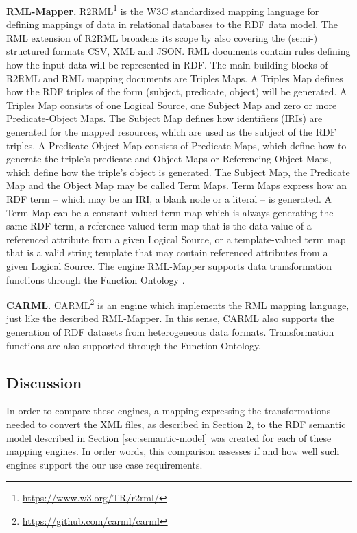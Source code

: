 \documentclass[runningheads]{llncs}
\begin{document}
\textbf{RML-Mapper.} R2RML\footnote{\url{https://www.w3.org/TR/r2rml/}} is the W3C standardized mapping language for defining mappings of data in relational databases to the RDF data model. The RML \cite{dimou_ldow_2014} extension of R2RML broadens its scope by also covering the (semi-) structured formats CSV, XML and JSON. RML documents contain rules defining how the input data will be represented in RDF. The main building blocks of R2RML and RML mapping documents are Triples Maps. A Triples Map defines how the RDF triples of the form (subject, predicate, object) will be generated. A Triples Map consists of one Logical Source, one Subject Map and zero or more Predicate-Object Maps. The Subject Map defines how identifiers (IRIs) are generated for the mapped resources, which are used as the subject of the RDF triples. A Predicate-Object Map consists of Predicate Maps, which define how to generate the triple’s predicate and Object Maps or Referencing Object Maps, which define how the triple's object is generated. The Subject Map, the Predicate Map and the Object Map may be called Term Maps. Term Maps express how an RDF term – which may be an IRI, a blank node or a literal – is generated. A Term Map can be a constant-valued term map which is always generating the same RDF term, a reference-valued term map that is the data value of a referenced attribute from a given Logical Source, or a template-valued term map that is a valid string template that may contain referenced attributes from a given Logical Source. The engine RML-Mapper supports data transformation functions through the Function Ontology \cite{DBLP:conf/esws/MeesterDVM16}. 

\textbf{CARML.} CARML\footnote{\url{https://github.com/carml/carml}} is an engine which implements the RML mapping language, just like the described RML-Mapper. In this sense, CARML also supports the generation of RDF datasets from heterogeneous data formats. Transformation functions are also supported through the Function Ontology.

\subsection{Discussion}

In order to compare these engines, a mapping expressing the transformations needed to convert the XML files, as described in Section 2, to the RDF semantic model described in Section \ref{sec:semantic-model} was created for each of these mapping engines. In order words, this comparison assesses if and how well such engines support the our use case requirements.
\end{document}
